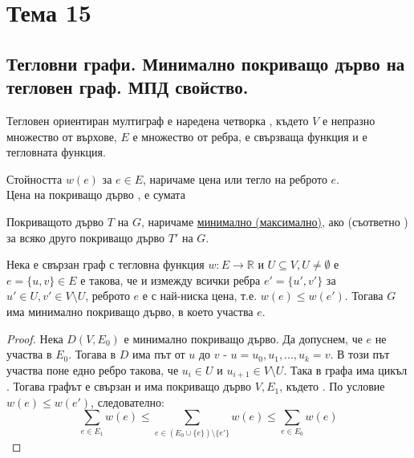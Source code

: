 \section{Тема 15}

\subsection*{Тегловни графи. Минимално покриващо дърво на тегловен граф. МПД свойство.}
\begin{definition}
    Тегловен ориентиран мултиграф е наредена четворка , където \(V\) е непразно 
    множество от върхове, \(E\) е множество от ребра,  
    е свързваща функция и  е тегловната функция.
\end{definition}

\begin{note}
    Стойността \(w(e)\) за \(e \in E\), наричаме цена или тегло на реброто \(e\). \\
    Цена на покриващо дърво , е сумата 
\end{note}

\begin{definition}
    Покриващото дърво \(T\) на \(G\), наричаме \underline{минимално (максимално)}, ако 
     (съответно ) за всяко друго покриващо дърво \(T'\) на \(G\).
\end{definition}

\begin{theorem}
    Нека \graf е свързан граф с тегловна функция \(w: E \to \mathbb{R}\) и \(U \subseteq V, U \not = 
    \emptyset\) е \(e = \{u, v\} \in E\) е такова, че  и измежду
    всички ребра \(e' = \{u', v'\}\) за \(u' \in U, v' \in V \setminus U\), реброто \(e\) е с 
    най-ниска цена, т.е. \(w(e) \le w(e')\). Тогава \(G\) има минимално покриващо дърво, в което 
    участва \(e\).
\end{theorem}

\begin{proof}
    Нека \(D(V, E_0)\) е минимално покриващо дърво. Да допуснем, че \(e\) не участва в \(E_0\). Тогава в 
    \(D\) има път от \(u\) до \(v\) - \(u = u_0, u_1, ..., u_k = v\). В този път участва поне едно ребро 
     такова, че \(u_i \in U\) и \(u_{i + 1} \in V \setminus U\). Така в 
    графа  има цикъл . Тогава 
    графът  е свързан и има покриващо дърво \(V, E_1\), 
    където . По условие \(w(e) \le w(e')\), 
    следователно:
    \begin{equation*}
        \sum_{e \in E_1} w(e) \le \sum_{e \in (E_0 \cup \{e\}) \setminus \{e'\}} w(e) \le 
        \sum_{e \in E_0} w(e)
    \end{equation*}
\end{proof}

